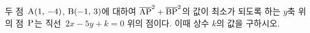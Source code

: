 두 점~$\mathrm{A}(1,\,-4)$, $\mathrm{B}(-1,\,3)$에 대하여 $\overline{\mathrm{AP}}^2+\overline{\mathrm{BP}}^2$의 값이 최소가 되도록 하는 $y$축 위의 점~$\mathrm{P}$는 직선~$2x-5y+k=0$ 위의 점이다. 이때 상수 $k$의 값을 구하시오.
